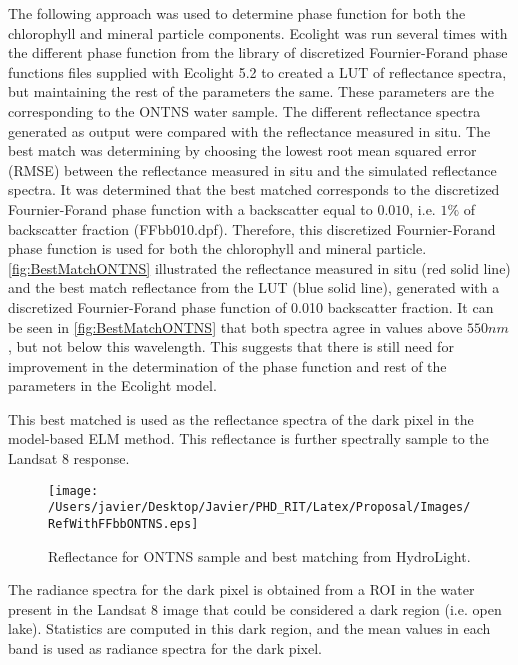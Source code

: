 The following approach was used to determine phase function for both the chlorophyll and mineral particle components. Ecolight was run several times with the different phase function from the library of discretized Fournier-Forand phase functions files supplied with Ecolight 5.2 to created a LUT of reflectance spectra, but maintaining the rest of the parameters the same. These parameters are the corresponding to the ONTNS water sample. The different reflectance spectra generated as output were compared with the reflectance measured in situ. The best match was determining by choosing the lowest root mean squared error (RMSE) between the reflectance measured in situ and the simulated reflectance spectra. It was determined that the best matched corresponds to the discretized Fournier-Forand phase function with a backscatter equal to $0.010$, i.e. $1\%$ of backscatter fraction (FFbb010.dpf). Therefore, this discretized Fournier-Forand phase function is used for both the chlorophyll and mineral particle. \autoref{fig:BestMatchONTNS} illustrated the reflectance measured in situ (red solid line) and the best match reflectance from the LUT (blue solid line), generated with a discretized Fournier-Forand phase function of 0.010 backscatter fraction. It can be seen in \autoref{fig:BestMatchONTNS} that both spectra agree in values above $550nm$, but not below this wavelength. This suggests that there is still need for improvement in the determination of the phase function and rest of the parameters in the Ecolight model.


This best matched is used as the reflectance spectra of the dark pixel in the model-based ELM method. This reflectance is further spectrally sample to the Landsat 8 response. 

\begin{figure}[!ht]
  	\centering
  	\texttt{[image: /Users/javier/Desktop/Javier/PHD\_RIT/Latex/Proposal/Images/RefWithFFbbONTNS.eps]}
  \caption{Reflectance for ONTNS sample and best matching from HydroLight. \label{fig:BestMatchONTNS} } 
\end{figure}


The radiance spectra for the dark pixel is obtained from a ROI in the water present in the Landsat 8 image that could be considered a dark region (i.e. open lake). Statistics are computed in this dark region, and the mean values in each band is used as radiance spectra for the dark pixel.


